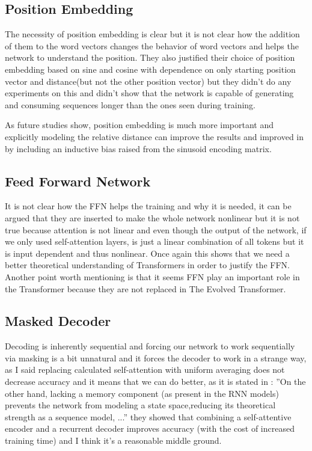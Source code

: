 \documentclass{article}
\begin{document}
\subsection{Position Embedding}
The necessity of position embedding is clear but it is not clear how the addition of them to the word vectors changes the behavior of word vectors and helps the network to understand the position.
They also justified their choice of position embedding based on sine and cosine with dependence on only starting position vector and distance(but not the other position vector) but they didn’t do any experiments on this and didn’t show that the network is capable of generating and consuming sequences longer than the ones seen during training.

As future studies show, position embedding is much more important and explicitly modeling the relative distance can improve the results\citep{1803.02155} and improved in \citep{1901.02860} by including an inductive bias raised from the sinusoid encoding matrix.

\subsection{Feed Forward Network}
It is not clear how the FFN helps the training and why it is needed, it can be argued that they are inserted to make the whole network nonlinear but it is not true because attention is not linear and even though the output of the network, if we only used self-attention layers, is just a linear combination of all tokens but it is input dependent and thus nonlinear. Once again this shows that we need a better theoretical understanding of Transformers in order to justify the FFN. Another point worth mentioning is that it seems FFN play an important role in the Transformer because they are not replaced in The Evolved Transformer\citep{1901.11117}.

\subsection{Masked Decoder}
Decoding is inherently sequential and forcing our network to work sequentially via masking is a bit unnatural and it forces the decoder to work in a strange way, as I said replacing calculated self-attention with uniform averaging does not decrease accuracy and it means that we can do better, as it is stated in \citep{1804.09849}: ''On  the  other  hand,  lacking  a  memory component (as present in the RNN models) prevents  the  network  from  modeling  a  state  space,reducing  its  theoretical  strength  as  a  sequence model, ...'' they showed that combining a self-attentive encoder and a recurrent decoder improves accuracy (with the cost of increased training time) and I think it’s a reasonable middle ground.
\end{document}
